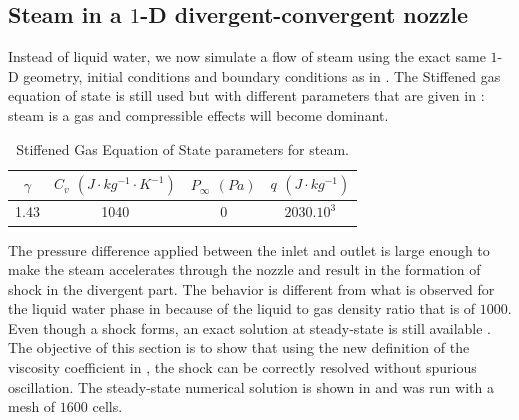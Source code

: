 \subsection{Steam in a $1$-D divergent-convergent nozzle} \label{sec:steam_nozzle}
Instead of liquid water, we now simulate a flow of steam using the exact same $1$-D geometry, initial conditions and boundary conditions as in . The Stiffened gas equation of state is still used but with different parameters that are given in : steam is a gas and compressible effects will become dominant. 
\begin{table}[H]
\begin{center}
 \caption{\label{tbl:stff_gas_eos_vap} Stiffened Gas Equation of State parameters for steam.}
 \begin{tabular}{|c|c|c|c|}
 \hline
$\gamma$ & $C_v$ $(J\cdot kg^{-1} \cdot K^{-1})$ & $P_{\infty}$ $(Pa)$ & $q$ $(J \cdot kg^{-1})$ \\
 \hline
1.43 & 1040 & 0 & $2030.10^3$   \\
 \hline
\end{tabular}
\end{center}
\end{table}
The pressure difference applied between the inlet and outlet is large enough to make the steam accelerates through the nozzle and result in the formation of shock in the divergent part. The behavior is different from what is observed for the liquid water phase in  because of the liquid to gas density ratio that is of $1000$. Even though a shock forms, an exact solution at steady-state is still available \cite{nozzle_exact}. The objective of this section is to show that using the new definition of the viscosity coefficient in , the shock can be correctly resolved without spurious oscillation. The steady-state numerical solution is shown in  and was run with a mesh of $1600$ cells.
